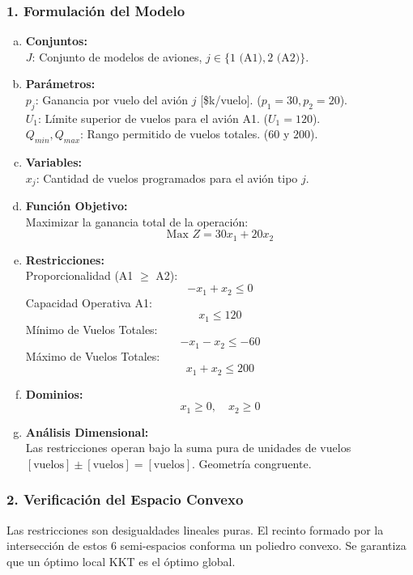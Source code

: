 \documentclass{article}
\begin{document}
	\subsubsection*{1. Formulación del Modelo}
	\begin{enumerate}[a)]
		\item \textbf{Conjuntos:}\\
		$J$: Conjunto de modelos de aviones, $j \in \{1 \text{ (A1)}, 2 \text{ (A2)}\}$.
		
		\item \textbf{Parámetros:}\\
		$p_j$: Ganancia por vuelo del avión $j$ [\$k/vuelo]. ($p_1=30, p_2=20$).\\
		$U_1$: Límite superior de vuelos para el avión A1. ($U_1=120$).\\
		$Q_{min}, Q_{max}$: Rango permitido de vuelos totales. ($60$ y $200$).
		
		\item \textbf{Variables:}\\
		$x_j$: Cantidad de vuelos programados para el avión tipo $j$.
		
		\item \textbf{Función Objetivo:}\\
		Maximizar la ganancia total de la operación:
		$$ \text{Max } Z = 30x_1 + 20x_2 $$
		
		\item \textbf{Restricciones:}\\
		Proporcionalidad (A1 $\geq$ A2): $$ -x_1 + x_2 \leq 0 $$
		Capacidad Operativa A1: $$ x_1 \leq 120 $$
		Mínimo de Vuelos Totales: $$ -x_1 - x_2 \leq -60 $$
		Máximo de Vuelos Totales: $$ x_1 + x_2 \leq 200 $$
		
		\item \textbf{Dominios:}\\
		$$ x_1 \geq 0, \quad x_2 \geq 0 $$
		
		\item \textbf{Análisis Dimensional:}\\
		Las restricciones operan bajo la suma pura de unidades de vuelos $[\text{vuelos}] \pm [\text{vuelos}] = [\text{vuelos}]$. Geometría congruente.
	\end{enumerate}
	
	\subsubsection*{2. Verificación del Espacio Convexo}
	Las restricciones son desigualdades lineales puras. El recinto formado por la intersección de estos 6 semi-espacios conforma un poliedro convexo. Se garantiza que un óptimo local KKT es el óptimo global.
	
\end{document}
